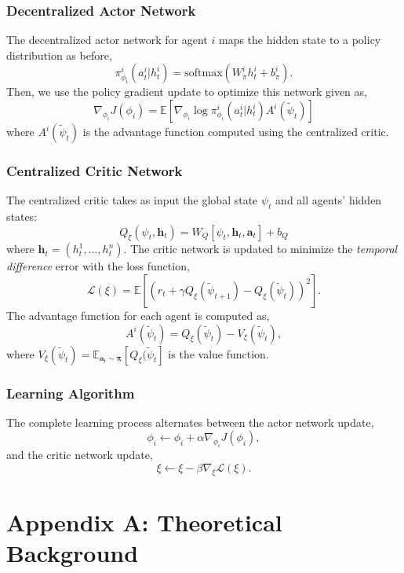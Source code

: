 \subsubsection*{Decentralized Actor Network}
The decentralized actor network for agent $i$ maps the hidden state to a policy distribution as before,
\[
    \pi^i_{\phi_i}(a^i_t|h^i_t) = \text{softmax}(W^i_{\pi}h^i_t + b^i_{\pi}).
\]
Then, we use the policy gradient update to optimize this network given as,
\[
    \nabla_{\phi_i} J(\phi_i) = \mathbb{E}\left[\nabla_{\phi_i} \log \pi^i_{\phi_i}(a^i_t|h^i_t) A^i(\tilde{\psi}_t)\right]
\]
where $A^i(\tilde{\psi}_t)$ is the advantage function computed using the centralized critic.

\subsubsection*{Centralized Critic Network}

The centralized critic takes as input the global state $\psi_t$ and all agents' hidden states:
\[
    Q_{\xi}(\psi_t, \mathbf{h}_t) = W_Q[\psi_t, \mathbf{h}_t, \mathbf{a}_t] + b_Q
\]
where $\mathbf{h}_t = (h^1_t, \ldots, h^n_t)$. The critic network is updated to minimize the \textit{temporal difference} error with the loss function,
\[
    \mathcal{L}(\xi) = \mathbb{E}\left[(r_t + \gamma Q_{\xi}(\tilde{\psi}_{t+1}) - Q_{\xi}(\tilde{\psi}_t))^2\right].
\]
The advantage function for each agent is computed as,
\[
    A^i(\tilde{\psi}_t) = Q_{\xi}(\tilde{\psi}_t) - V_{\xi}(\tilde{\psi}_t),
\]
where $V_{\xi}(\tilde{\psi}_t) = \mathbb{E}_{\mathbf{a}_t \sim \boldsymbol{\pi}}[Q_{\xi}(\tilde{\psi}_t]$ is the value function.


\subsubsection*{Learning Algorithm}
The complete learning process alternates between the actor network update,
\[
    \phi_i \leftarrow \phi_i + \alpha \nabla_{\phi_i} J(\phi_i),
\]
and the critic network update,
\[
    \xi \leftarrow \xi - \beta \nabla_{\xi} \mathcal{L}(\xi).
\]









\pagebreak

\section*{Appendix A: Theoretical Background}

